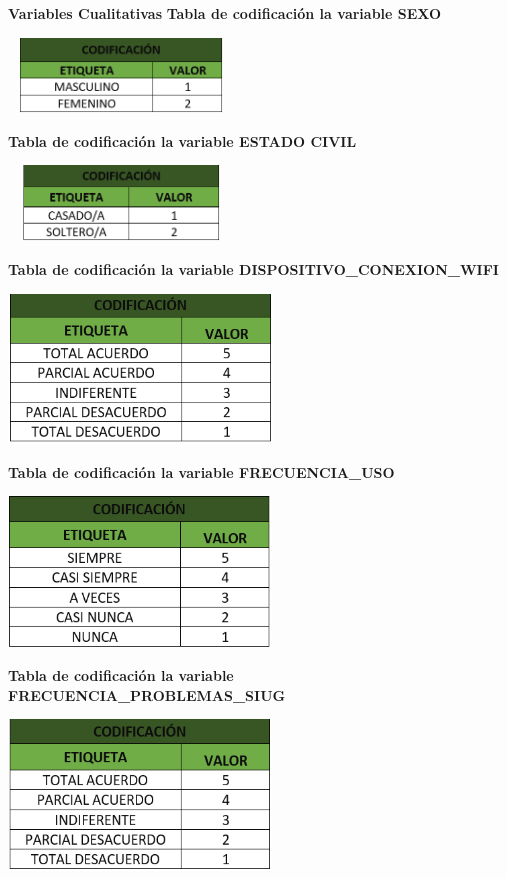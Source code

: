 \documentclass[12pt, a4paper, nofontenc, numbers=endperiod]{apa7}
\begin{document}
{\begin{itemize}
\end{itemize}
\newpage
\justify
\textbf{Variables Cualitativas}
\textbf{Tabla de codificación la variable SEXO}
\begin{center}
	\includegraphics[width=6cm,height=2cm]{Imagenes/Figura18}
\end{center}
\textbf{Tabla de codificación la variable ESTADO CIVIL}
\begin{center}
	\includegraphics[width=6cm,height=2cm]{Imagenes/Figura19}
\end{center}
\textbf{Tabla de codificación la variable DISPOSITIVO\_CONEXION\_WIFI}
\begin{center}
	\includegraphics[width=7cm,height=4cm]{Imagenes/Figura20}
\end{center}
\textbf{Tabla de codificación la variable FRECUENCIA\_USO}
\begin{center}
	\includegraphics[width=7cm,height=4cm]{Imagenes/Figura21}
\end{center}
\textbf{Tabla de codificación la variable FRECUENCIA\_PROBLEMAS\_SIUG}
\begin{center}
	\includegraphics[width=7cm,height=4cm]{Imagenes/Figura22}

\end{center}}
\end{document}
